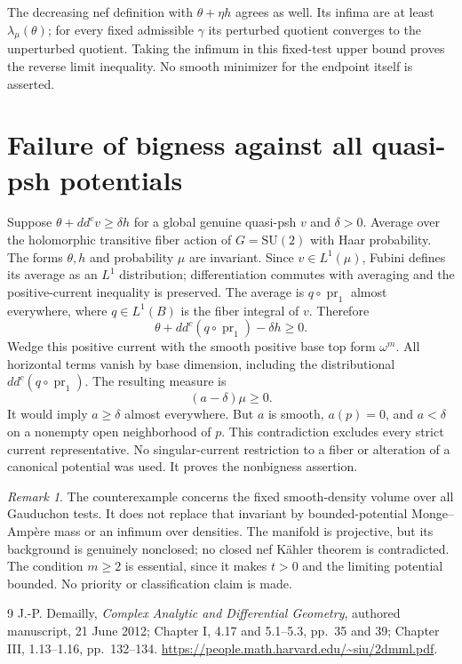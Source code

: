 \documentclass[11pt]{article}
\newcommand{\ddc}{dd^c}
\theoremstyle{remark}\newtheorem{remark}[theorem]{Remark}
\begin{document}
The decreasing nef definition with $\theta+\eta h$ agrees as well.
Its infima are at least $\lambda_\mu(\theta)$; for every fixed admissible
$\gamma$ its perturbed quotient converges to the unperturbed quotient.
Taking the infimum in this fixed-test upper bound proves the reverse limit
inequality. No smooth minimizer for the endpoint itself is asserted.

\section{Failure of bigness against all quasi-psh potentials}
Suppose $\theta+\ddc v\geq\delta h$ for a global genuine quasi-psh $v$
and $\delta>0$. Average over the holomorphic transitive fiber action
of $G=\mathrm{SU}(2)$ with Haar probability. The forms $\theta,h$ and
probability $\mu$ are invariant. Since $v\in L^1(\mu)$, Fubini defines
its average as an $L^1$ distribution; differentiation commutes with averaging
and the positive-current inequality is preserved.
The average is $q\circ\operatorname{pr}_1$ almost everywhere, where
$q\in L^1(B)$ is the fiber integral of $v$. Therefore
\[
 \theta+\ddc(q\circ\operatorname{pr}_1)-\delta h\geq0.
\]
Wedge this positive current with the smooth positive base top form
$\omega^m$. All horizontal terms vanish by base dimension, including the
distributional $\ddc(q\circ\operatorname{pr}_1)$. The resulting measure is
\[
 (a-\delta)\mu\geq0.
\]
It would imply $a\geq\delta$ almost everywhere. But $a$ is smooth,
$a(p)=0$, and $a<\delta$ on a nonempty open neighborhood of $p$.
This contradiction excludes every strict current representative.
No singular-current restriction to a fiber or alteration of a canonical
potential was used. It proves the nonbigness assertion.

\begin{remark}
The counterexample concerns the fixed smooth-density volume over all
Gauduchon tests. It does not replace that invariant by bounded-potential
Monge--Amp\`ere mass or an infimum over densities. The manifold is projective,
but its background is genuinely nonclosed; no closed nef K\"ahler theorem
is contradicted. The condition $m\geq2$ is essential, since it makes
$t>0$ and the limiting potential bounded. No priority or classification
claim is made.
\end{remark}
\begin{thebibliography}{9}
 J.-P. Demailly, \emph{Complex Analytic and Differential Geometry},
authored manuscript, 21 June 2012; Chapter I, 4.17 and 5.1--5.3,
pp.~35 and 39; Chapter III, 1.13--1.16, pp.~132--134.
\url{https://people.math.harvard.edu/~siu/2dmml.pdf}.
\end{thebibliography}
\end{document}
